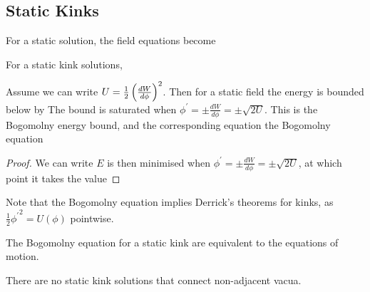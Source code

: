 \documentclass{article}
\begin{document}
\subsection{Static Kinks}

For a static solution, the field equations become

\begin{theorem}
For a static kink solutions, 
\end{theorem}

\begin{prop}
Assume we can write $U=\frac{1}{2}\left( \frac{dW}{d\phi} \right)^2$. Then for a static field the energy is bounded below by
The bound is saturated when $\phi^\prime = \pm \frac{dW}{d\phi} = \pm\sqrt{2U}$. This is the Bogomolny energy bound, and the corresponding equation the Bogomolny equation
\end{prop}
\begin{proof}
We can write 
$E$ is then minimised when $\phi^\prime = \pm \frac{dW}{d\phi} = \pm\sqrt{2U}$, at which point it takes the value 
\end{proof}

\begin{remark}
Note that the Bogomolny equation implies Derrick's theorems for kinks, as $\frac{1}{2}{\phi^\prime}^2 = U(\phi)$ pointwise. 
\end{remark}

\begin{prop}
The Bogomolny equation for a static kink are equivalent to the equations of motion. 
\end{prop}

\begin{prop}
There are no static kink solutions that connect non-adjacent vacua.
\end{prop}
\end{document}
